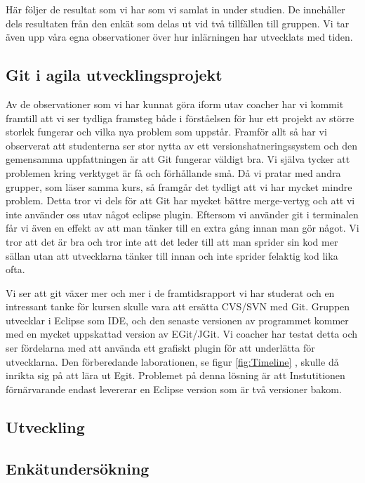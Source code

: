 Här följer de resultat som vi har som vi samlat in under studien. De innehåller dels resultaten från den enkät som delas ut vid två tillfällen till gruppen. Vi tar även upp våra egna observationer över hur inlärningen har utvecklats med tiden. 


\subsection{Git i agila utvecklingsprojekt}
Av de observationer som vi har kunnat göra iform utav coacher har vi kommit framtill att vi ser tydliga framsteg både i förståelsen för hur ett projekt av större storlek fungerar och vilka nya problem som uppstår. Framför allt så har vi observerat att studenterna ser stor nytta av ett versionshatneringssystem och den gemensamma uppfattningen är att Git fungerar väldigt bra. Vi själva tycker att problemen kring verktyget är få och förhållande små. Då vi pratar med andra grupper, som läser samma kurs, så framgår det tydligt att vi har mycket mindre problem. Detta tror vi dels för att Git har mycket bättre merge-vertyg och att vi inte använder oss utav något eclipse plugin. Eftersom vi använder git i terminalen får vi även en effekt av att man tänker till en extra gång innan man gör något. Vi tror att det är bra och tror inte att det leder till att man sprider sin kod mer sällan utan att utvecklarna tänker till innan och inte sprider felaktig kod lika ofta. 

Vi ser att git växer mer och mer i de framtidsrapport vi har studerat och en intressant tanke för kursen skulle vara att ersätta CVS/SVN med Git. Gruppen utvecklar i Eclipse som IDE, och den senaste versionen av programmet kommer med en mycket uppskattad version av EGit/JGit. Vi coacher har testat detta och ser fördelarna med att använda ett grafiskt plugin för att underlätta för utvecklarna. Den förberedande laborationen, se figur \ref{fig:Timeline} , skulle då inrikta sig på att lära ut Egit. Problemet på denna lösning är att Instutitionen förnärvarande endast levererar en Eclipse version som är två versioner bakom. 


\subsection{Utveckling}
\subsection{Enkätundersökning}

